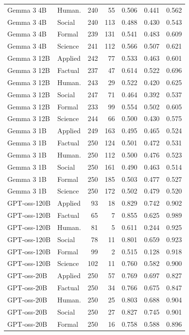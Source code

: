 \begin{longtable}{llrrrrr}
Gemma 3 4B & Human. & 240 & 55 & 0.506 & 0.441 & 0.562 \\
Gemma 3 4B & Social & 240 & 113 & 0.488 & 0.430 & 0.543 \\
Gemma 3 4B & Formal & 239 & 131 & 0.541 & 0.483 & 0.609 \\
Gemma 3 4B & Science & 241 & 112 & 0.566 & 0.507 & 0.621 \\
Gemma 3 12B & Applied & 242 & 77 & 0.533 & 0.463 & 0.601 \\
Gemma 3 12B & Factual & 237 & 47 & 0.614 & 0.522 & 0.696 \\
Gemma 3 12B & Human. & 243 & 29 & 0.522 & 0.420 & 0.625 \\
Gemma 3 12B & Social & 247 & 71 & 0.464 & 0.392 & 0.537 \\
Gemma 3 12B & Formal & 233 & 99 & 0.554 & 0.502 & 0.605 \\
Gemma 3 12B & Science & 244 & 66 & 0.500 & 0.430 & 0.575 \\
Gemma 3 1B & Applied & 249 & 163 & 0.495 & 0.465 & 0.524 \\
Gemma 3 1B & Factual & 250 & 124 & 0.501 & 0.472 & 0.531 \\
Gemma 3 1B & Human. & 250 & 112 & 0.500 & 0.476 & 0.523 \\
Gemma 3 1B & Social & 250 & 161 & 0.490 & 0.463 & 0.514 \\
Gemma 3 1B & Formal & 250 & 185 & 0.503 & 0.477 & 0.527 \\
Gemma 3 1B & Science & 250 & 172 & 0.502 & 0.479 & 0.520 \\
GPT-oss-120B & Applied & 93 & 18 & 0.829 & 0.742 & 0.902 \\
GPT-oss-120B & Factual & 65 & 7 & 0.855 & 0.625 & 0.989 \\
GPT-oss-120B & Human. & 81 & 5 & 0.611 & 0.244 & 0.925 \\
GPT-oss-120B & Social & 78 & 11 & 0.801 & 0.659 & 0.923 \\
GPT-oss-120B & Formal & 99 & 2 & 0.515 & 0.128 & 0.918 \\
GPT-oss-120B & Science & 102 & 11 & 0.760 & 0.582 & 0.900 \\
GPT-oss-20B & Applied & 250 & 57 & 0.769 & 0.697 & 0.827 \\
GPT-oss-20B & Factual & 250 & 34 & 0.766 & 0.675 & 0.847 \\
GPT-oss-20B & Human. & 250 & 25 & 0.803 & 0.688 & 0.904 \\
GPT-oss-20B & Social & 250 & 27 & 0.827 & 0.745 & 0.901 \\
GPT-oss-20B & Formal & 250 & 16 & 0.758 & 0.588 & 0.896 \\

\end{longtable}
